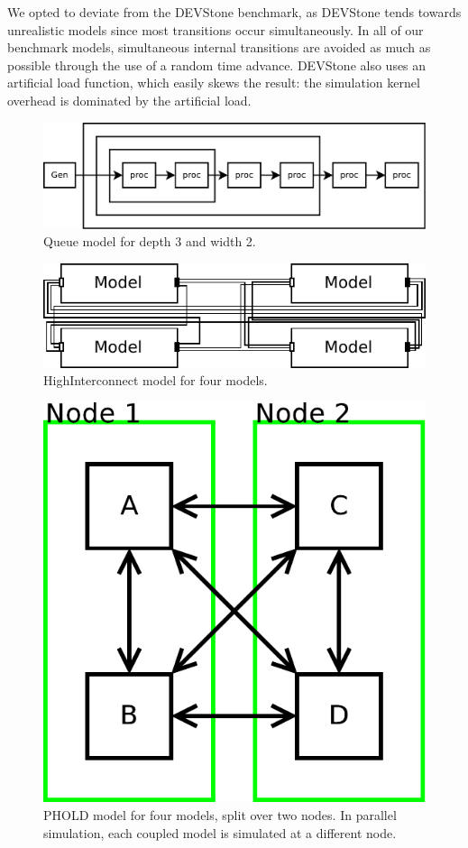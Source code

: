 We opted to deviate from the DEVStone benchmark, as DEVStone tends towards unrealistic models since most transitions occur simultaneously.
In all of our benchmark models, simultaneous internal transitions are avoided as much as possible through the use of a random time advance.
DEVStone also uses an artificial load function, which easily skews the result: the simulation kernel overhead is dominated by the artificial load.

\begin{figure}
    \center
    \includegraphics[width=\columnwidth]{fig/queue_model.pdf}
    \caption{Queue model for depth 3 and width 2.}
    \label{fig:queue_model}
\end{figure}

\begin{figure}
    \center
    \includegraphics[width=\columnwidth]{fig/interconnect_model.pdf}
    \caption{HighInterconnect model for four models.}
    \label{fig:interconnect_model}
\end{figure}

\begin{figure}
    \center
    \includegraphics[width=0.5\columnwidth]{fig/phold_model.pdf}
    \caption{PHOLD model for four models, split over two nodes. In parallel simulation, each coupled model is simulated at a different node.}
    \label{fig:PHOLD_model}
\end{figure}

